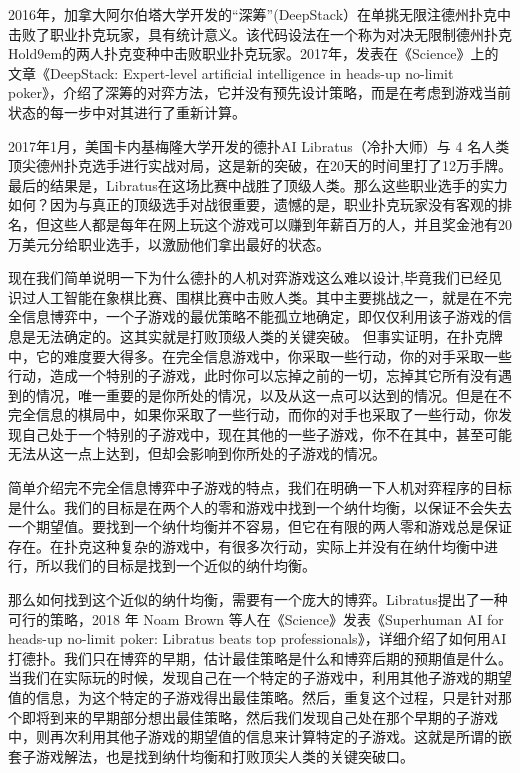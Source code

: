 \documentclass{article}
\begin{document}
2016年，加拿大阿尔伯塔大学开发的“深筹”(DeepStack）在单挑无限注德州扑克中击败了职业扑克玩家，具有统计意义。该代码设法在一个称为对决无限制德州扑克Hold9em的两人扑克变种中击败职业扑克玩家。2017年，发表在《Science》上的文章《DeepStack: Expert-level artificial intelligence in heads-up no-limit poker》\citep{dd}，介绍了深筹的对弈方法，它并没有预先设计策略，而是在考虑到游戏当前状态的每一步中对其进行了重新计算。\par
2017年1月，美国卡内基梅隆大学开发的德扑AI Libratus（冷扑大师）与 4 名人类顶尖德州扑克选手进行实战对局，这是新的突破，在20天的时间里打了12万手牌。最后的结果是，Libratus在这场比赛中战胜了顶级人类。那么这些职业选手的实力如何？因为与真正的顶级选手对战很重要，遗憾的是，职业扑克玩家没有客观的排名，但这些人都是每年在网上玩这个游戏可以赚到年薪百万的人，并且奖金池有20万美元分给职业选手，以激励他们拿出最好的状态。\par
现在我们简单说明一下为什么德扑的人机对弈游戏这么难以设计,毕竟我们已经见识过人工智能在象棋比赛、围棋比赛中击败人类。其中主要挑战之一，就是在不完全信息博弈中，一个子游戏的最优策略不能孤立地确定，即仅仅利用该子游戏的信息是无法确定的。这其实就是打败顶级人类的关键突破。 但事实证明，在扑克牌中，它的难度要大得多。在完全信息游戏中，你采取一些行动，你的对手采取一些行动，造成一个特别的子游戏，此时你可以忘掉之前的一切，忘掉其它所有没有遇到的情况，唯一重要的是你所处的情况，以及从这一点可以达到的情况。但是在不完全信息的棋局中，如果你采取了一些行动，而你的对手也采取了一些行动，你发现自己处于一个特别的子游戏中，现在其他的一些子游戏，你不在其中，甚至可能无法从这一点上达到，但却会影响到你所处的子游戏的情况。 \par
简单介绍完不完全信息博弈中子游戏的特点，我们在明确一下人机对弈程序的目标是什么。我们的目标是在两个人的零和游戏中找到一个纳什均衡，以保证不会失去一个期望值。要找到一个纳什均衡并不容易，但它在有限的两人零和游戏总是保证存在。在扑克这种复杂的游戏中，有很多次行动，实际上并没有在纳什均衡中进行，所以我们的目标是找到一个近似的纳什均衡。\par 
那么如何找到这个近似的纳什均衡，需要有一个庞大的博弈。Libratus提出了一种可行的策略，2018 年 Noam Brown 等人在《Science》发表《Superhuman AI for heads-up no-limit poker: Libratus beats top professionals》\citep{ee}，详细介绍了如何用AI打德扑。我们只在博弈的早期，估计最佳策略是什么和博弈后期的预期值是什么。当我们在实际玩的时候，发现自己在一个特定的子游戏中，利用其他子游戏的期望值的信息，为这个特定的子游戏得出最佳策略。然后，重复这个过程，只是针对那个即将到来的早期部分想出最佳策略，然后我们发现自己处在那个早期的子游戏中，则再次利用其他子游戏的期望值的信息来计算特定的子游戏。这就是所谓的嵌套子游戏解法，也是找到纳什均衡和打败顶尖人类的关键突破口。\par
\end{document}
